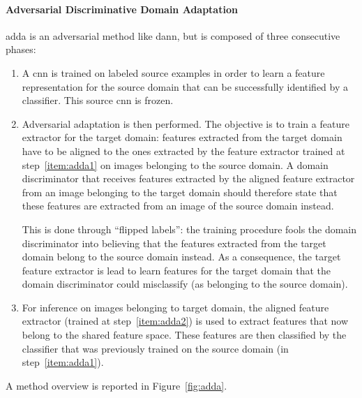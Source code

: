 \documentclass[%
    corpo=12pt,
    twoside,
    stile=classica,   
    tipotesi=magistrale,
    evenboxes,
    english,
	numerazioneromana,
]{toptesi}
\newcommand{\quotes}[1]{``#1''}
\begin{document}
\paragraph{Adversarial Discriminative Domain Adaptation}\label{sec:adda}
\gls{adda}\cite{tzeng2017adversarial} is an adversarial method like \gls{dann}, but is composed of three consecutive phases:
\begin{enumerate}
	\item \label{item:adda1} A \gls{cnn} is trained on labeled source examples in order to learn a feature representation for the source domain that can be successfully identified by a classifier. This source \gls{cnn} is frozen.
	
	\item \label{item:adda2} Adversarial adaptation is then performed.
	The objective is to train a feature extractor for the target domain: features extracted from the target domain have to be aligned to the ones extracted by the feature extractor trained at step~\ref{item:adda1} on images belonging to the source domain. A domain discriminator that receives features extracted by the aligned feature extractor from an image belonging to the target domain should therefore state that these features are extracted from an image of the source domain instead.
	
	This is done through \quotes{flipped labels}: the training procedure fools the domain discriminator into believing that the features extracted from the target domain belong to the source domain instead. As a consequence, the target feature extractor is lead to learn features for the target domain that the domain discriminator could misclassify (as belonging to the source domain).
	
	\item For inference on images belonging to target domain, the aligned feature extractor (trained at step~\ref{item:adda2}) is used to extract features that now belong to the shared feature space. These features are then classified by the classifier that was previously trained on the source domain (in step~\ref{item:adda1}).
\end{enumerate}
A method overview is reported in Figure~\ref{fig:adda}.
\end{document}
